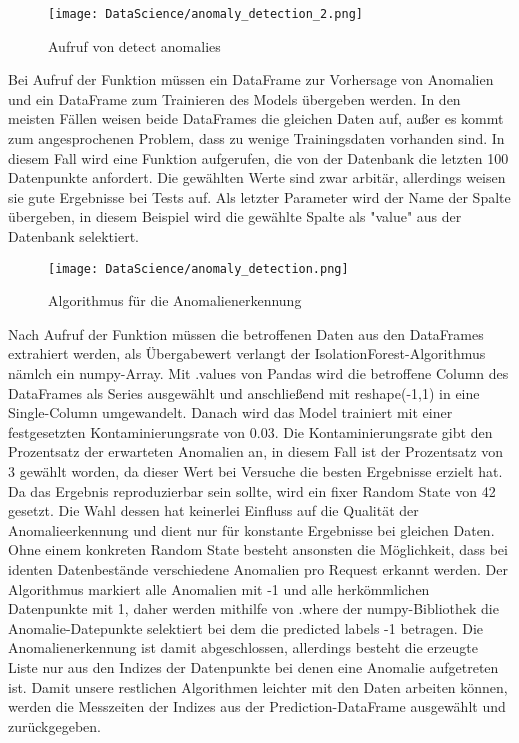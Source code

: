 \documentclass{report}
\begin{document}
\begin{figure}[H]
    \centering
     \texttt{[image: DataScience/anomaly\_detection\_2.png]}
    \caption{Aufruf von detect anomalies}
\end{figure}
Bei Aufruf der Funktion müssen ein DataFrame zur Vorhersage von Anomalien und ein DataFrame zum Trainieren des Models übergeben werden. In den meisten Fällen weisen beide DataFrames die gleichen Daten auf, außer es kommt zum angesprochenen Problem, dass zu wenige Trainingsdaten vorhanden sind. In diesem Fall wird eine Funktion aufgerufen, die von der Datenbank die letzten 100 Datenpunkte anfordert. Die gewählten Werte sind zwar arbitär, allerdings weisen sie gute Ergebnisse bei Tests auf. Als letzter Parameter wird der Name der Spalte übergeben, in diesem Beispiel wird die gewählte Spalte als "value" aus der Datenbank selektiert. 

\begin{figure}[H]
    \centering
    \texttt{[image: DataScience/anomaly\_detection.png]}
    \caption{Algorithmus für die Anomalienerkennung}
\end{figure}
Nach Aufruf der Funktion müssen die betroffenen Daten aus den DataFrames extrahiert werden, als Übergabewert verlangt der IsolationForest-Algorithmus nämlch ein numpy-Array. Mit .values von Pandas wird die betroffene Column des DataFrames als Series ausgewählt und anschließend mit reshape(-1,1) in eine Single-Column umgewandelt. Danach wird das Model trainiert mit einer festgesetzten Kontaminierungsrate von 0.03. Die Kontaminierungsrate gibt den Prozentsatz der erwarteten Anomalien an, in diesem Fall ist der Prozentsatz von 3 gewählt worden, da dieser Wert bei Versuche die besten Ergebnisse erzielt hat. Da das Ergebnis reproduzierbar sein sollte, wird ein fixer Random State von 42 gesetzt. Die Wahl dessen hat keinerlei Einfluss auf die Qualität der Anomalieerkennung und dient nur für konstante Ergebnisse bei gleichen Daten. Ohne einem konkreten Random State besteht ansonsten die Möglichkeit, dass bei identen Datenbestände verschiedene Anomalien pro Request erkannt werden. Der Algorithmus markiert alle Anomalien mit -1 und alle herkömmlichen Datenpunkte mit 1, daher werden mithilfe von .where der numpy-Bibliothek die Anomalie-Datepunkte selektiert bei dem die predicted labels -1 betragen. Die Anomalienerkennung ist damit abgeschlossen, allerdings besteht die erzeugte Liste nur aus den Indizes der Datenpunkte bei denen eine Anomalie aufgetreten ist. Damit unsere restlichen Algorithmen leichter mit den Daten arbeiten können, werden die Messzeiten der Indizes aus der Prediction-DataFrame ausgewählt und zurückgegeben. 
\end{document}
